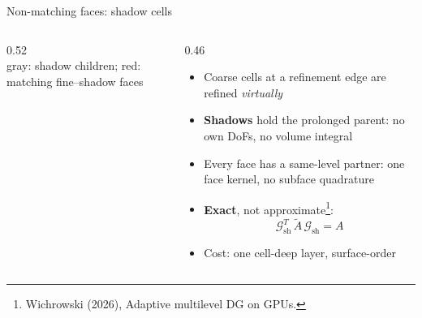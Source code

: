 \documentclass{beamer}
\begin{document}
\begin{frame}{Non-matching faces: shadow cells}
    \begin{columns}[c]
        \begin{column}{0.52\textwidth}
            \centering
            \resizebox{\textwidth}{!}{}\\[0.3em]
            {\scriptsize gray: shadow children; red: matching fine--shadow faces}
        \end{column}
        \begin{column}{0.46\textwidth}
            \footnotesize
            \begin{itemize}
                \item Coarse cells at a refinement edge are refined \emph{virtually}
                \item \textbf{Shadows} hold the prolonged parent: no own DoFs, no volume integral
                \item Every face has a \alert{same-level partner}: one face kernel, no subface quadrature \pause
                \item \textbf{Exact}, not approximate\footnote{Wichrowski (2026), Adaptive multilevel DG on GPUs.}:
                      \[
                          \mathcal G_{\text{sh}}^T\,\tilde A\,\mathcal G_{\text{sh}} = A
                      \]
                \item Cost: one cell-deep layer, surface-order
            \end{itemize}
        \end{column}
    \end{columns}
\end{frame}
\end{document}
